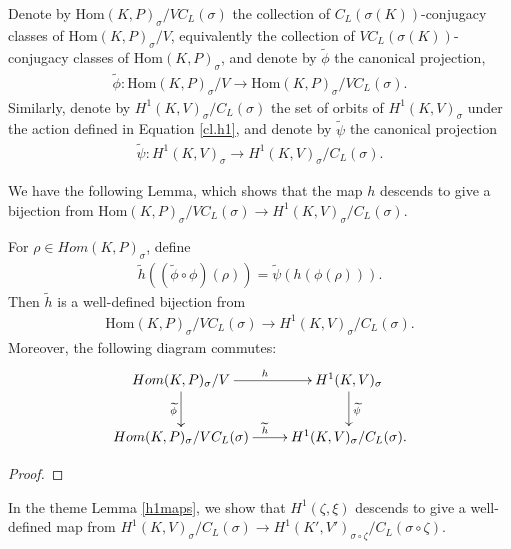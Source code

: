 	\begin{definition}
		Denote by $\mathrm{Hom}(K, P)_\sigma/VC_L(\sigma)$ the collection of $C_L(\sigma(K))$-conjugacy classes of $\mathrm{Hom}(K, P)_\sigma/V$, equivalently the collection of $VC_L(\sigma(K))$-conjugacy classes of $\mathrm{Hom}(K, P)_\sigma$, and denote by $\widetilde{\phi}$ the canonical projection,
		\begin{align*}
			\widetilde{\phi}: \mathrm{Hom}(K, P)_\sigma/V \rightarrow \mathrm{Hom}(K, P)_\sigma/VC_L(\sigma).
		\end{align*}
		Similarly, denote by $H^1(K, V)_\sigma/C_L(\sigma)$ the set of orbits of $H^1(K, V)_\sigma$ under the action defined in Equation \ref{cl.h1}, and denote by $\widetilde{\psi}$ the canonical projection
		\begin{align*}
			\widetilde{\psi}:H^1(K, V)_\sigma \rightarrow H^1(K, V)_\sigma/C_L(\sigma).
		\end{align*}
	\end{definition}

	We have the following Lemma, which shows that the map $h$ descends to give a bijection from $\mathrm{Hom}(K, P)_\sigma /VC_L(\sigma) \rightarrow H^1(K, V)_{\sigma}/C_L(\sigma)$.

\begin{lemma}
	For $\rho \in Hom(K, P)_\sigma$, define
	\begin{align*}
		\widetilde{h}((\widetilde{\phi}\circ\phi)(\rho)) = \widetilde{\psi}(h(\phi(\rho))).
	\end{align*}
	Then $\widetilde{h}$ is a well-defined bijection from
	\begin{align*}
		\mathrm{Hom}(K, P)_\sigma / VC_L(\sigma) \rightarrow H^1(K, V)_\sigma/C_L(\sigma).
	\end{align*}
	Moreover, the following diagram commutes:
  \begin{align*}
    \xymatrix{
		Hom(K, P)_{\sigma}/V \ar[r]^h \ar[d]_{\widetilde{\phi}} & H^{1}(K, V)_\sigma \ar[d]^{\widetilde{\psi}} \\
		Hom(K, P)_{\sigma}/VC_L(\sigma) \ar[r]^{\widetilde{h}} & H^{1}(K, V)_\sigma/C_L(\sigma).
    }
  \end{align*}
\end{lemma}
\begin{proof}
\end{proof}

In the theme Lemma \ref{h1maps}, we show that $H^1(\zeta, \xi)$ descends to give a well-defined map from $H^1(K, V)_\sigma/C_L(\sigma) \rightarrow H^1(K', V')_{\sigma \circ \zeta}/C_L(\sigma \circ \zeta)$.

